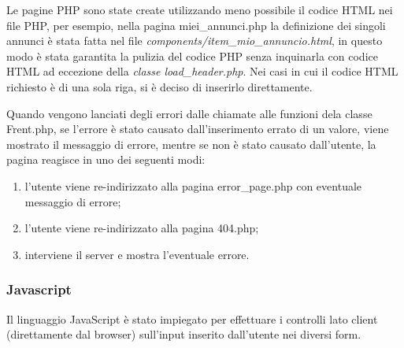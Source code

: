\documentclass[1_relazione.tex]{subfiles}
\begin{document}
Le pagine PHP sono state create utilizzando meno possibile il codice HTML nei file PHP, per esempio, nella pagina miei\_annunci.php la definizione dei singoli annunci \`{e} stata fatta nel file \textit{components/item\_mio\_annuncio.html}, in questo modo \`{e} stata garantita la pulizia del codice PHP senza inquinarla con codice HTML ad eccezione della \textit{classe load\_header.php}. Nei casi in cui il codice HTML richiesto \`{e} di una sola riga, si \`{e} deciso di inserirlo direttamente.

Quando vengono lanciati degli errori dalle chiamate alle funzioni dela classe Frent.php, se l'errore \`{e} stato causato dall'inserimento errato di un valore, viene mostrato il messaggio di errore, mentre se non \`{e} stato causato dall'utente, la pagina reagisce in uno dei seguenti modi:
\begin{enumerate}
    \item l'utente viene re-indirizzato alla pagina error\_page.php con eventuale messaggio di errore;
    \item l'utente viene re-indirizzato alla pagina 404.php;
    \item interviene il server e mostra l'eventuale errore. 
\end{enumerate}

\subsubsection{Javascript}
Il linguaggio JavaScript è stato impiegato per effettuare i controlli lato client (direttamente dal browser) sull'input inserito dall'utente nei diversi form.
\end{document}

